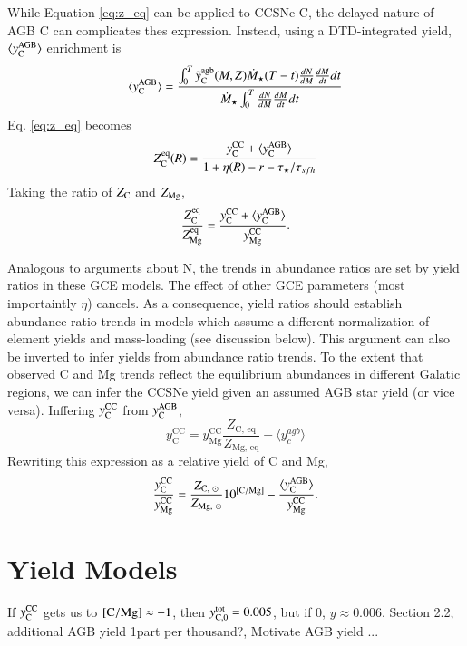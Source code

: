 \documentclass[12pt,oneside]{report}
\newcommand{\Ycc}{\ensuremath{y_{\rm C}^{\rm CC}}}
\newcommand{\Yct}{\ensuremath{y_{\rm C, 0}^{\rm tot}}}
\newcommand{\Yoc}{\ensuremath{y_{\rm Mg}^{\rm CC}}}
\newcommand{\Ycagb}{\ensuremath{y_{\rm C}^{\rm AGB}}}
\begin{document}
While Equation \ref{eq:z_eq} can be applied to CCSNe C, the delayed nature of AGB C can complicates thes expression. Instead, using a DTD-integrated yield, $\langle \Ycagb \rangle$ enrichment is
\begin{equation}
    \langle \Ycagb\rangle = \frac{\int_0^T \tilde{y}_{\rm C}^{\rm agb}(M, Z) \dot{M}_\star(T - t) \frac{dN}{dM} \frac{dM}{dt} dt  }{ \dot{M}_\star \int_0^T \frac{dN}{dM} \frac{dM}{dt} dt}
\end{equation}
Eq. \ref{eq:z_eq} becomes
\begin{equation}
    Z_{\rm C}^{\rm eq}(R) = \frac{\Ycc + \langle\Ycagb\rangle}{1 + \eta(R) - r - \tau_\star / \tau_{sfh}}
\end{equation}
Taking the ratio of $Z_{\rm C}$ and $Z_{\rm Mg}$, 
\begin{equation}\label{eq:z_co}
    \frac{Z_{\rm C}^{\rm eq}}{Z_{\rm Mg}^{\rm eq}} = \frac{\Ycc + \langle \Ycagb \rangle }{\Yoc}.
\end{equation}

Analogous to \cite{james+22} arguments about N, the trends in abundance ratios are set by yield ratios in these GCE models. The effect of other GCE parameters (most importaintly $\eta$) cancels. As a consequence, yield ratios should establish abundance ratio trends in models which assume a different normalization of element yields and mass-loading (see discussion below).
This argument can also be inverted to infer  yields from abundance ratio trends. To the extent that observed C and Mg trends reflect the equilibrium abundances in different Galatic regions, we can infer the CCSNe yield given an assumed AGB star yield (or vice versa). Inffering $\Ycc$ from $\Ycagb$, 
\begin{equation}
    y_\text{C}^\text{CC} =  y_\text{Mg}^\text{CC} \frac{Z_\text{C,~eq}}{Z_\text{Mg,~eq}} - \langle y_c^{agb} \rangle
\end{equation}
Rewriting this expression as a relative yield of C and Mg,
\begin{equation}
    \frac{\Ycc}{\Yoc} = \frac{Z_{\text{C},~\odot}}{Z_{\text{Mg},~\odot}} 10^{\rm [C/Mg]} - \frac{\langle \Ycagb \rangle}{\Yoc}.
\end{equation}

\section{Yield Models}

If $\Ycc$ gets us to ${\rm [C/Mg] } \approx -1$, then $\Yct = 0.005$, but if 0, $y\approx0.006$. 
Section 2.2, additional AGB yield 1part per thousand?, Motivate AGB yield ...
\end{document}
